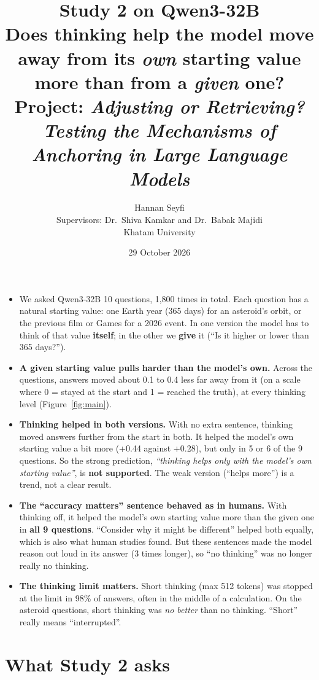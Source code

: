 \documentclass[11pt,a4paper]{article}
\title{\textbf{Study 2 on Qwen3-32B}\\[4pt]
\large Does thinking help the model move away from its \emph{own} starting value more than from a \emph{given} one?\\[2pt]
\normalsize Project: \emph{Adjusting or Retrieving? Testing the Mechanisms of Anchoring in Large Language Models}}
\author{Hannan Seyfi\\[6pt]
\normalsize Supervisors: Dr.\ Shiva Kamkar and Dr.\ Babak Majidi\\
\normalsize Khatam University}
\date{29 October 2026}
\begin{document}
\maketitle

\begin{keybox}
\begin{itemize}[leftmargin=1.2em]
  \item We asked Qwen3-32B 10 questions, 1,800 times in total. Each question has a natural starting value: one Earth year (365 days) for an asteroid's orbit, or the previous film or Games for a 2026 event. In one version the model has to think of that value \textbf{itself}; in the other we \textbf{give} it (``Is it higher or lower than 365 days?'').
  \item \textbf{A given starting value pulls harder than the model's own.} Across the questions, answers moved about 0.1 to 0.4 less far away from it (on a scale where 0 = stayed at the start and 1 = reached the truth), at every thinking level (Figure~\ref{fig:main}).
  \item \textbf{Thinking helped in both versions.} With no extra sentence, thinking moved answers further from the start in both. It helped the model's own starting value a bit more (+0.44 against +0.28), but only in 5 or 6 of the 9 questions. So the strong prediction, \emph{``thinking helps only with the model's own starting value''}, is \textbf{not supported}. The weak version (``helps more'') is a trend, not a clear result.
  \item \textbf{The ``accuracy matters'' sentence behaved as in humans.} With thinking off, it helped the model's own starting value more than the given one in \textbf{all 9 questions}. ``Consider why it might be different'' helped both equally, which is also what human studies found. But these sentences made the model reason out loud in its answer (3 times longer), so ``no thinking'' was no longer really no thinking.
  \item \textbf{The thinking limit matters.} Short thinking (max 512 tokens) was stopped at the limit in 98\% of answers, often in the middle of a calculation. On the asteroid questions, short thinking was \emph{no better} than no thinking. ``Short'' really means ``interrupted''.
\end{itemize}
\end{keybox}

\section{What Study 2 asks}
\end{document}
